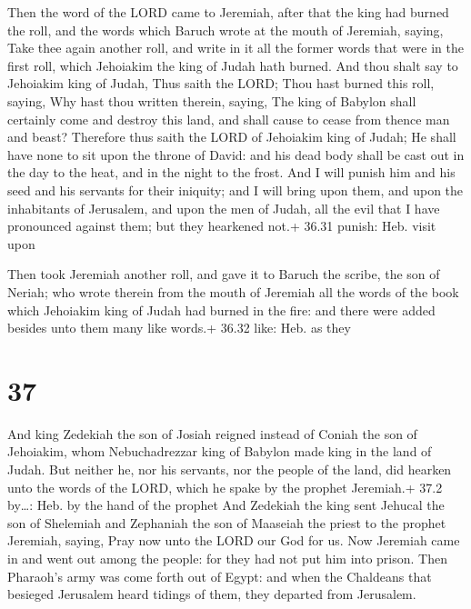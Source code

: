  Then the word of the LORD came to Jeremiah, after that
the king had burned the roll, and the words which Baruch wrote at the
mouth of Jeremiah, saying,  Take thee again another roll,
and write in it all the former words that were in the first roll, which
Jehoiakim the king of Judah hath burned.  And thou shalt
say to Jehoiakim king of Judah, Thus saith the LORD; Thou hast burned
this roll, saying, Why hast thou written therein, saying, The king of
Babylon shall certainly come and destroy this land, and shall cause to
cease from thence man and beast?  Therefore thus saith the
LORD of Jehoiakim king of Judah; He shall have none to sit upon the
throne of David: and his dead body shall be cast out in the day to the
heat, and in the night to the frost.  And I will punish him
and his seed and his servants for their iniquity; and I will bring upon
them, and upon the inhabitants of Jerusalem, and upon the men of Judah,
all the evil that I have pronounced against them; but they hearkened
not.+ 36.31 punish: Heb. visit upon

 Then took Jeremiah another roll, and gave it to Baruch
the scribe, the son of Neriah; who wrote therein from the mouth of
Jeremiah all the words of the book which Jehoiakim king of Judah had
burned in the fire: and there were added besides unto them many like
words.+ 36.32 like: Heb. as they

\hypertarget{section-36}{%
\section{37}\label{section-36}}

 And king Zedekiah the son of Josiah reigned instead of
Coniah the son of Jehoiakim, whom Nebuchadrezzar king of Babylon made
king in the land of Judah.  But neither he, nor his
servants, nor the people of the land, did hearken unto the words of the
LORD, which he spake by the prophet Jeremiah.+ 37.2 by\ldots: Heb. by
the hand of the prophet  And Zedekiah the king sent Jehucal
the son of Shelemiah and Zephaniah the son of Maaseiah the priest to the
prophet Jeremiah, saying, Pray now unto the LORD our God for us.
 Now Jeremiah came in and went out among the people: for
they had not put him into prison.  Then Pharaoh's army was
come forth out of Egypt: and when the Chaldeans that besieged Jerusalem
heard tidings of them, they departed from Jerusalem.

